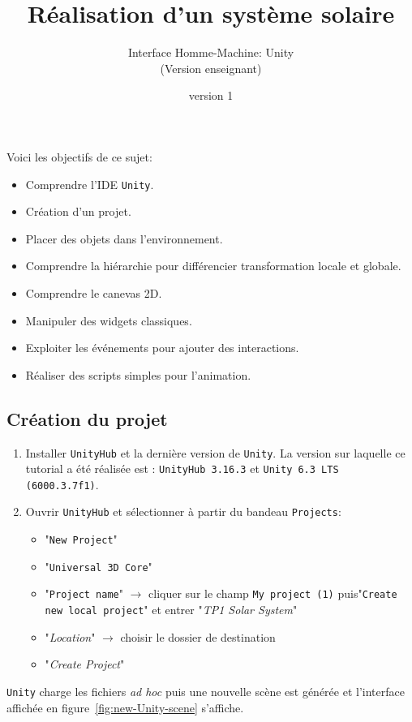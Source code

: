 \documentclass[a4paper,10pt]{article}
\newenvironment{solution}%
{\begin{tcolorbox}[breakable,colback=red!5!white,colframe=red!75!black,title=Solution]}%
{\end{tcolorbox}}
\begin{document}
	


\title{\vspace*{-1cm}Réalisation d'un système solaire}
\author{\vspace*{-1.5cm}Interface Homme-Machine: Unity
\begin{ensnote}
	(Version enseignant)
\end{ensnote}
}
\date{\vspace*{-1.5cm}version 1}
\maketitle
\thispagestyle{fancy}


Voici les objectifs de ce sujet:
\begin{itemize}
	\item Comprendre l'IDE \texttt{Unity}.
	\item Création d'un projet.
	\item Placer des objets dans l'environnement.
	\item Comprendre la hiérarchie pour différencier transformation locale et globale.
	\item Comprendre le canevas 2D.
	\item Manipuler des widgets classiques.
	\item Exploiter les événements pour ajouter des interactions.
	\item Réaliser des scripts simples pour l'animation.
\end{itemize}


\ifversionenseignant
\begin{solution}
\section{Création du projet}

\begin{enumerate}
	\item Installer  \texttt{UnityHub} et la dernière version de \texttt{Unity}. La version sur laquelle ce tutorial a été réalisée est : \texttt{UnityHub 3.16.3} et \texttt{Unity 6.3 LTS (6000.3.7f1)}.
	\item  Ouvrir \texttt{UnityHub} et sélectionner à partir du bandeau \texttt{Projects}:
	\begin{itemize}
		\item "\texttt{New Project}"
		\item "\texttt{Universal 3D Core}"
		\item "\texttt{Project name}" $\rightarrow$ cliquer sur le champ \texttt{My project (1)} puis"\texttt{Create new local project}" et entrer "\textit{TP1 Solar System}"
		\item "\textit{Location}" $\rightarrow$ choisir le dossier de destination
		\item "\textit{Create Project}"		
	\end{itemize}
\end{enumerate}
	
\texttt{Unity} charge les fichiers \textit{ad hoc} puis une nouvelle scène est générée et l'interface affichée en figure~\ref{fig:new-Unity-scene} s'affiche.
\end{solution}
\end{document}
